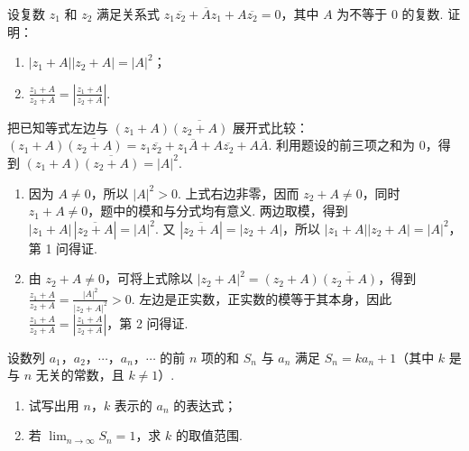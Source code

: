 \documentclass[UTF8,a4paper,oneside,11pt]{ctexbook}
\begin{document}
\begin{problem}
设复数 \(z_1\) 和 \(z_2\) 满足关系式 \(z_1\overline{z_2} + \overline{A}z_1 + A\overline{z_2} = 0\)，其中 \(A\) 为不等于 \(0\) 的复数. 证明：

\begin{enumerate}
\item \(|z_1 + A||z_2 + A| = |A|^2\)；
\item \(\frac{z_1 + A}{z_2 + A} = \left|\frac{z_1 + A}{z_2 + A}\right|\).
\end{enumerate}
\end{problem}

\begin{solution}
把已知等式左边与 \((z_1+A)\overline{(z_2+A)}\) 展开式比较：\((z_1+A)\overline{(z_2+A)}=z_1\overline{z_2}+z_1\overline A+A\overline{z_2}+A\overline A\). 利用题设的前三项之和为 \(0\)，得到 \((z_1+A)\overline{(z_2+A)}=|A|^2\).

\begin{enumerate}
\item 因为 \(A\ne0\)，所以 \(|A|^2>0\). 上式右边非零，因而 \(z_2+A\ne0\)，同时 \(z_1+A\ne0\)，题中的模和与分式均有意义. 两边取模，得到 \(|z_1+A|\,|\overline{z_2+A}|=|A|^2\). 又 \(|\overline{z_2+A}|=|z_2+A|\)，所以 \(|z_1+A||z_2+A|=|A|^2\)，第 1 问得证.

\item 由 \(z_2+A\ne0\)，可将上式除以 \(|z_2+A|^2=(z_2+A)\overline{(z_2+A)}\)，得到 \(\frac{z_1+A}{z_2+A}=\frac{|A|^2}{|z_2+A|^2}>0\). 左边是正实数，正实数的模等于其本身，因此 \(\frac{z_1+A}{z_2+A}=\left|\frac{z_1+A}{z_2+A}\right|\)，第 2 问得证.
\end{enumerate}
\end{solution}

\begin{problem}
设数列 \(a_1\)，\(a_2\)，\(\cdots\)，\(a_n\)，\(\cdots\) 的前 \(n\) 项的和 \(S_n\) 与 \(a_n\) 满足 \(S_n = ka_n + 1\)（其中 \(k\) 是与 \(n\) 无关的常数，且 \(k \neq 1\)）.

\begin{enumerate}
\item 试写出用 \(n\)，\(k\) 表示的 \(a_n\) 的表达式；
\item 若 \(\displaystyle\lim_{n\to\infty}S_n = 1\)，求 \(k\) 的取值范围.
\end{enumerate}
\end{problem}
\end{document}
